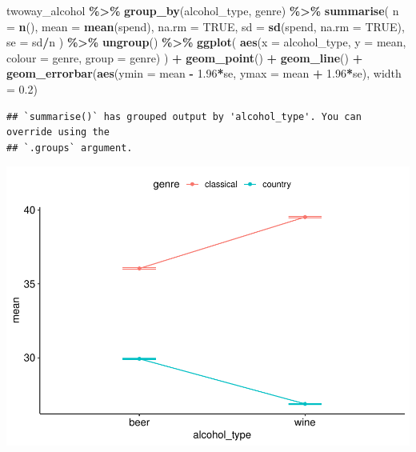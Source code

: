 \documentclass[
]{book}
\newenvironment{Shaded}{\begin{snugshade}}{\end{snugshade}}
\newcommand{\AttributeTok}[1]{\textcolor[rgb]{0.13,0.29,0.53}{#1}}
\newcommand{\ConstantTok}[1]{\textcolor[rgb]{0.56,0.35,0.01}{#1}}
\newcommand{\FloatTok}[1]{\textcolor[rgb]{0.00,0.00,0.81}{#1}}
\newcommand{\FunctionTok}[1]{\textcolor[rgb]{0.13,0.29,0.53}{\textbf{#1}}}
\newcommand{\NormalTok}[1]{#1}
\newcommand{\SpecialCharTok}[1]{\textcolor[rgb]{0.81,0.36,0.00}{\textbf{#1}}}
\begin{document}
\begin{Shaded}
\begin{Highlighting}[]
\NormalTok{twoway\_alcohol }\SpecialCharTok{\%\textgreater{}\%}
  \FunctionTok{group\_by}\NormalTok{(alcohol\_type, genre) }\SpecialCharTok{\%\textgreater{}\%}
  \FunctionTok{summarise}\NormalTok{(}
    \AttributeTok{n =} \FunctionTok{n}\NormalTok{(),}
    \AttributeTok{mean =} \FunctionTok{mean}\NormalTok{(spend), }\AttributeTok{na.rm =} \ConstantTok{TRUE}\NormalTok{,}
    \AttributeTok{sd =} \FunctionTok{sd}\NormalTok{(spend, }\AttributeTok{na.rm =} \ConstantTok{TRUE}\NormalTok{),}
    \AttributeTok{se =}\NormalTok{ sd}\SpecialCharTok{/}\NormalTok{n}
\NormalTok{  ) }\SpecialCharTok{\%\textgreater{}\%}
  \FunctionTok{ungroup}\NormalTok{() }\SpecialCharTok{\%\textgreater{}\%}
  \FunctionTok{ggplot}\NormalTok{(}
    \FunctionTok{aes}\NormalTok{(}\AttributeTok{x =}\NormalTok{ alcohol\_type, }\AttributeTok{y =}\NormalTok{ mean, }\AttributeTok{colour =}\NormalTok{ genre, }\AttributeTok{group =}\NormalTok{ genre)}
\NormalTok{  ) }\SpecialCharTok{+}
  \FunctionTok{geom\_point}\NormalTok{() }\SpecialCharTok{+}
  \FunctionTok{geom\_line}\NormalTok{() }\SpecialCharTok{+}
  \FunctionTok{geom\_errorbar}\NormalTok{(}\FunctionTok{aes}\NormalTok{(}\AttributeTok{ymin =}\NormalTok{ mean }\SpecialCharTok{{-}} \FloatTok{1.96}\SpecialCharTok{*}\NormalTok{se, }\AttributeTok{ymax =}\NormalTok{ mean }\SpecialCharTok{+} \FloatTok{1.96}\SpecialCharTok{*}\NormalTok{se), }\AttributeTok{width =} \FloatTok{0.2}\NormalTok{)}
\end{Highlighting}
\end{Shaded}

\begin{verbatim}
## `summarise()` has grouped output by 'alcohol_type'. You can override using the
## `.groups` argument.
\end{verbatim}

\includegraphics{_main_files/figure-latex/unnamed-chunk-226-1.pdf}
\end{document}
